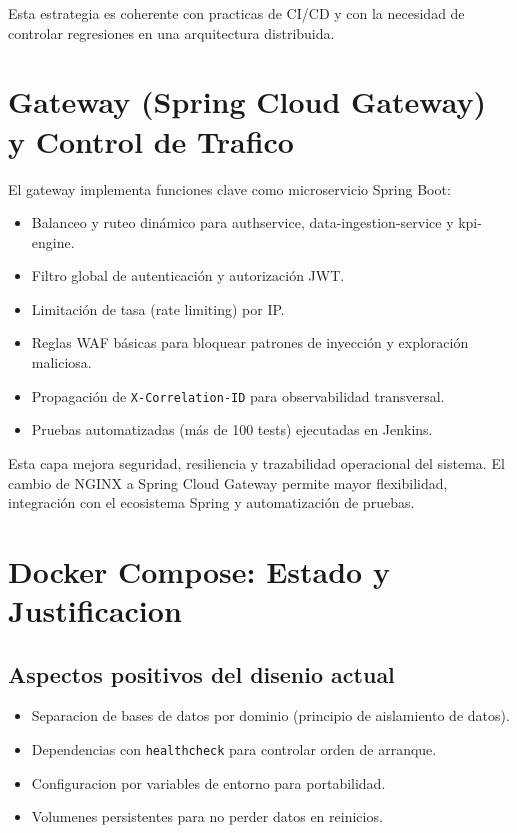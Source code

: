 \documentclass[12pt,a4paper]{article}
\begin{document}
Esta estrategia es coherente con practicas de CI/CD y con la necesidad de controlar regresiones en una arquitectura distribuida.

\section{Gateway (Spring Cloud Gateway) y Control de Trafico}
El gateway implementa funciones clave como microservicio Spring Boot:
\begin{itemize}[leftmargin=*]
    \item Balanceo y ruteo dinámico para authservice, data-ingestion-service y kpi-engine.
    \item Filtro global de autenticación y autorización JWT.
    \item Limitación de tasa (rate limiting) por IP.
    \item Reglas WAF básicas para bloquear patrones de inyección y exploración maliciosa.
    \item Propagación de \texttt{X-Correlation-ID} para observabilidad transversal.
    \item Pruebas automatizadas (más de 100 tests) ejecutadas en Jenkins.
\end{itemize}

Esta capa mejora seguridad, resiliencia y trazabilidad operacional del sistema. El cambio de NGINX a Spring Cloud Gateway permite mayor flexibilidad, integración con el ecosistema Spring y automatización de pruebas.

\section{Docker Compose: Estado y Justificacion}
\subsection{Aspectos positivos del disenio actual}
\begin{itemize}[leftmargin=*]
    \item Separacion de bases de datos por dominio (principio de aislamiento de datos).
    \item Dependencias con \texttt{healthcheck} para controlar orden de arranque.
    \item Configuracion por variables de entorno para portabilidad.
    \item Volumenes persistentes para no perder datos en reinicios.
\end{itemize}
\end{document}
